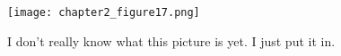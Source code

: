 \documentclass[11pt,fleqn]{book} %
\begin{document}
\begin{figure}[h]
  \centering\texttt{[image: chapter2\_figure17.png]}
  \caption{I don't really know what this picture is yet. I just put it in.}
\end{figure}




\cleardoublepage
{}
\setlength{\columnsep}{0.75cm}
\printindex

\end{document}
